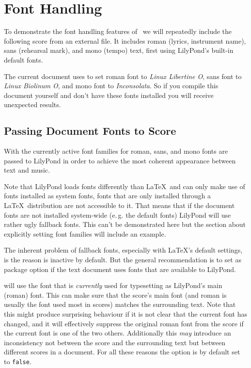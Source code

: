 \documentclass{scrartcl}
\begin{document}
\section*{Font Handling}

To demonstrate the font handling features of \lyluatex\ we will repeatedly
include the following score from an external file.  It includes roman (lyrics,
instrument name), sans (rehearsal mark), and mono (tempo) text, first using
LilyPond's built-in default fonts.


\bigskip
The current document uses  to set roman font to \emph{Linux
Libertine O}, sans font to \emph{Linux Biolinum O}, and mono font to
\emph{Inconsolata}. So if you compile this document yourself and don't have
these fonts installed you will receive unexpected results.

\subsection*{Passing Document Fonts to Score}

With  the currently active font families for roman, sans, and
mono fonts are passed to LilyPond in order to achieve the most coherent
appearance between text and music.

\bigskip


\bigskip
Note that LilyPond loads fonts differently than \LaTeX\ and can only make use of
fonts installed as system fonts, fonts that are only installed through a \LaTeX\
distribution are not accessible to it. That means that if the document fonts are
not installed system-wide (e.\,g. the default fonts) LilyPond will use rather
ugly fallback fonts. This can't be demonstrated here but the section about
explicitly setting font families will include an example.

The inherent problem of fallback fonts, especially with \LaTeX's default
settings, is the reason  is inactive by default. But the
general recommendation is to set \option{pass-fonts} as package option if the
text document uses fonts that are available to LilyPond.

\bigskip

\sffamily {} will use the font that is
\emph{currently} used for typesetting as LilyPond's main (roman) font. This can
make sure that the score's main font (and roman is usually the font used most in
scores) matches the surrounding text. Note that this might produce surprising
behaviour if it is not clear that the current font has changed, and it will
effectively suppress the original roman font from the score if the current font
is one of the two others. Additionally this \emph{may} introduce an
inconsistency not between the score and the surrounding text but between
different scores in a document. For all these reasons the option is by default
set to \texttt{false}.
\end{document}

